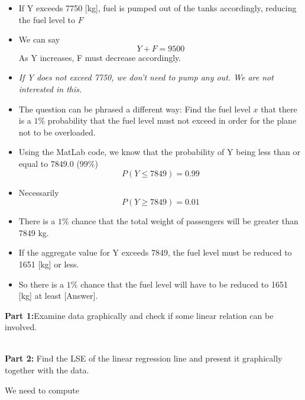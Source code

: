 \begin{itemize}
	\item If Y exceeds 7750 [kg], fuel is pumped out of the tanks accordingly, reducing the fuel level to $F$
	\item We can say \[ Y + F = 9500 \]
	As Y increases, F must decrease accordingly.
	\item \emph{If Y does not exceed 7750, we don't need to pump any out. We are not interested in this.}
	\item The question can be phrased a different way: Find the fuel level $x$ that there is a $1\%$ probability that the fuel level must not exceed in order for the plane not to be overloaded.
	
\end{itemize}




\begin{itemize}
	\item  Using the MatLab code, we know that the probability of Y being less than or equal to 7849.0 ($99\%$)
	\[ P(Y \leq 7849) = 0.99\]
	\item Necessarily  \[ P(Y \geq 7849) = 0.01\]
	\item There is a $1\%$ chance that the total weight of passengers will be greater than 7849 kg.
	\item If the aggregate value for Y exceeds 7849, the fuel level must be reduced to 1651 [kg] or less.
	\item So there is a $1\%$ chance that the fuel level will have to be reduced to 1651 [kg] at least [Answer].
	
\end{itemize}



\noindent\textbf{Part 1:}Examine data graphically and check if some linear relation can be involved.

\\
\bigskip
\noindent\textbf{Part 2: }Find the LSE of the linear regression line and present it graphically together with the data.

We need to compute

